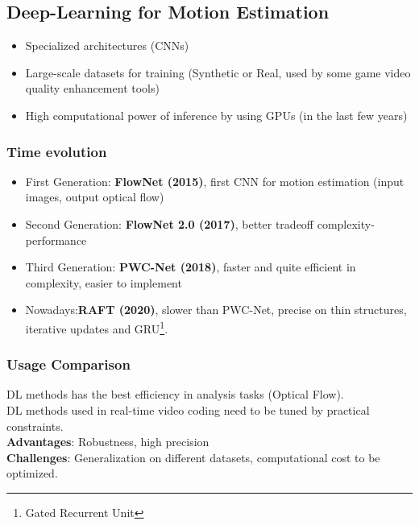\subsection{Deep-Learning for Motion Estimation}
\begin{itemize}
    \item Specialized architectures (CNNs)
    \item Large-scale datasets for training (Synthetic or Real, used by some game video quality enhancement tools)
    \item High computational power of inference by using GPUs (in the last few years)
\end{itemize}
\subsubsection{Time evolution}
\begin{itemize}
    \item First Generation: \textbf{FlowNet (2015)}, first CNN for motion estimation (input images, output optical flow)
    \item Second Generation: \textbf{FlowNet 2.0 (2017)}, better tradeoff complexity-performance
    \item Third Generation: \textbf{PWC-Net (2018)}, faster and quite efficient in complexity, easier to implement
    \item Nowadays:\textbf{RAFT (2020)}, slower than PWC-Net, precise on thin structures, iterative updates and GRU\footnote{Gated Recurrent Unit}.
\end{itemize}
\subsubsection{Usage Comparison}
DL methods has the best efficiency in analysis tasks (Optical Flow).\\
DL methods used in real-time video coding need to be tuned by practical constraints.\\
\textbf{Advantages}: Robustness, high precision\\
\textbf{Challenges}: Generalization on different datasets, computational cost to be optimized.
